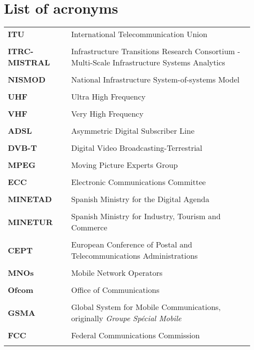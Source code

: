 \chapter{List of acronyms}
\begin{longtable}{ p{2.5cm} p{10cm}}
  \bf ITU &  International Telecommunication Union \\ \\
  \bf ITRC- MISTRAL &  Infrastructure Transitions Research Consortium - Multi-Scale Infrastructure Systems Analytics \\ \\
  \bf NISMOD & National Infrastructure System-of-systems Model \\ \\
  \bf UHF & Ultra High Frequency  \\ \\
  \bf VHF &  Very High Frequency \\ \\
  \bf ADSL & Asymmetric Digital Subscriber Line  \\ \\
  \bf DVB-T & Digital Video Broadcasting-Terrestrial  \\ \\
  \bf MPEG &  Moving Picture Experts Group \\ \\
  \bf ECC & Electronic Communications Committee \\ \\
  \bf MINETAD   & Spanish Ministry for the Digital Agenda \\ \\
  \bf MINETUR & Spanish Ministry for Industry, Tourism and Commerce  \\ \\
  \bf CEPT & European Conference of Postal and Telecommunications Administrations  \\ \\
  \bf MNOs &  Mobile Network Operators \\ \\
  \bf Ofcom &  Office of Communications \\ \\
  \bf GSMA &  Global System for Mobile Communications, originally \textit{Groupe Spécial Mobile} \\ \\
  \bf FCC &  Federal Communications Commission  \\ \\

\end{longtable}

